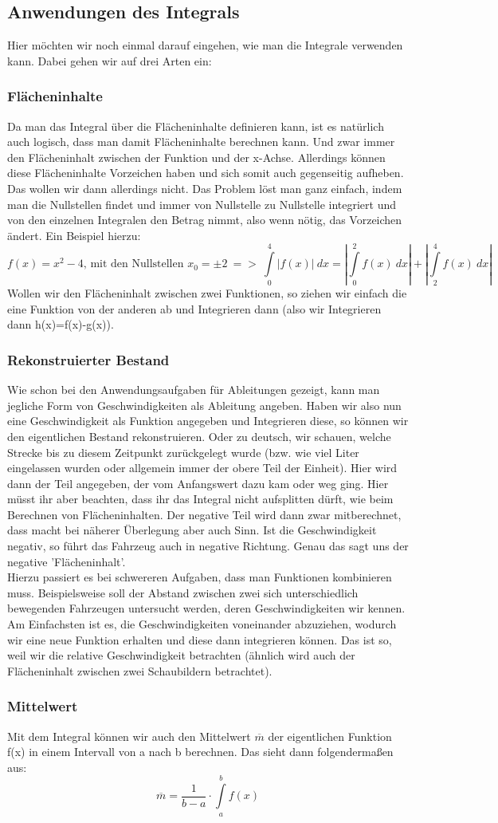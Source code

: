 \subsection{Anwendungen des Integrals}
Hier möchten wir noch einmal darauf eingehen, wie man die Integrale verwenden kann. Dabei gehen wir auf drei Arten ein:
\subsubsection{Flächeninhalte}
Da man das Integral über die Flächeninhalte definieren kann, ist es natürlich auch logisch, dass man damit Flächeninhalte berechnen kann. Und zwar immer den Flächeninhalt zwischen der Funktion und der x-Achse. Allerdings können diese Flächeninhalte Vorzeichen haben und sich somit auch gegenseitig aufheben. Das wollen wir dann allerdings nicht. Das Problem löst man ganz einfach, indem man die Nullstellen findet und immer von Nullstelle zu Nullstelle integriert und von den einzelnen Integralen den Betrag nimmt, also wenn nötig, das Vorzeichen ändert. Ein Beispiel hierzu:
\[f(x)=x^2-4\textrm{, mit den Nullstellen }x_0=\pm2\ =>\ \int\limits_0^4 |f(x)|\ dx=|\int\limits_0^2 f(x)\ dx|+|\int\limits_2^4 f(x)\ dx|\]
Wollen wir den Flächeninhalt zwischen zwei Funktionen, so ziehen wir einfach die eine Funktion von der anderen ab und Integrieren dann (also wir Integrieren dann h(x)=f(x)-g(x)).
\subsubsection{Rekonstruierter Bestand}
Wie schon bei den Anwendungsaufgaben für Ableitungen gezeigt, kann man jegliche Form von Geschwindigkeiten als Ableitung angeben. Haben wir also nun eine Geschwindigkeit als Funktion angegeben und Integrieren diese, so können wir den eigentlichen Bestand rekonstruieren. Oder zu deutsch, wir schauen, welche Strecke bis zu diesem Zeitpunkt zurückgelegt wurde (bzw. wie viel Liter eingelassen wurden oder allgemein immer der obere Teil der Einheit). Hier wird dann der Teil angegeben, der vom Anfangswert dazu kam oder weg ging. Hier müsst ihr aber beachten, dass ihr das Integral nicht aufsplitten dürft, wie beim Berechnen von Flächeninhalten. Der negative Teil wird dann zwar mitberechnet, dass macht bei näherer Überlegung aber auch Sinn. Ist die Geschwindigkeit negativ, so führt das Fahrzeug auch in negative Richtung. Genau das sagt uns der negative 'Flächeninhalt'.\\
Hierzu passiert es bei schwereren Aufgaben, dass man Funktionen kombinieren muss. Beispielsweise soll der Abstand zwischen zwei sich unterschiedlich bewegenden Fahrzeugen untersucht werden, deren Geschwindigkeiten wir kennen. Am Einfachsten ist es, die Geschwindigkeiten voneinander abzuziehen, wodurch wir eine neue Funktion erhalten und diese dann integrieren können. Das ist so, weil wir die relative Geschwindigkeit betrachten (ähnlich wird auch der Flächeninhalt zwischen zwei Schaubildern betrachtet).
\subsubsection{Mittelwert}
Mit dem Integral können wir auch den Mittelwert \(\overline{m}\) der eigentlichen Funktion f(x) in einem Intervall von a nach b berechnen. Das sieht dann folgendermaßen aus:
\[\overline{m}=\frac{1}{b-a}\cdot \int\limits_a^b f(x)\]
